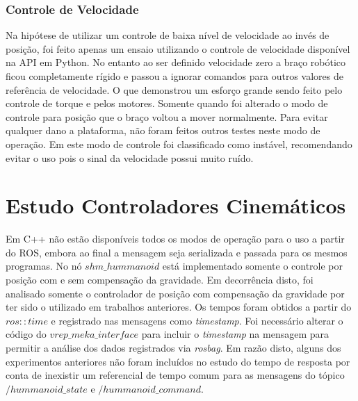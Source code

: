 \subsubsection{Controle de Velocidade}

Na hipótese de utilizar um controle de baixa nível de velocidade ao invés de posição, foi feito apenas um ensaio utilizando o controle de velocidade disponível na API em Python. No entanto ao ser definido velocidade zero a braço robótico ficou completamente rígido e passou a ignorar comandos para outros valores de referência de velocidade. O que demonstrou um esforço grande sendo feito pelo controle de torque e pelos motores. Somente quando foi alterado o modo de controle para posição que o braço voltou a mover normalmente. Para evitar qualquer dano a plataforma, não foram feitos outros testes neste modo de operação. Em \cite{mekartfd} este modo de controle foi classificado como instável, recomendando evitar o uso pois o sinal da velocidade possui muito ruído.





\section{Estudo Controladores Cinemáticos}

Em C++ não estão disponíveis todos os modos de operação para o uso a partir do ROS, embora ao final a mensagem seja serializada e passada para os mesmos programas. No nó $shm\_hummanoid$ está implementado somente o controle por posição com e sem compensação da gravidade. Em decorrência disto, foi analisado somente o controlador de posição com compensação da gravidade por ter sido o utilizado em trabalhos anteriores. Os tempos foram obtidos a partir do $ros::time$ e registrado nas mensagens como \textit{timestamp}. Foi necessário alterar o código do $vrep\_meka\_interface$ para incluir o \textit{timestamp} na mensagem para permitir a análise dos dados registrados via \textit{rosbag}. Em razão disto, alguns dos experimentos anteriores não foram incluídos no estudo do tempo de resposta por conta de inexistir um referencial de tempo comum para as mensagens do tópico $/hummanoid\_state$ e $/hummanoid\_command$.

